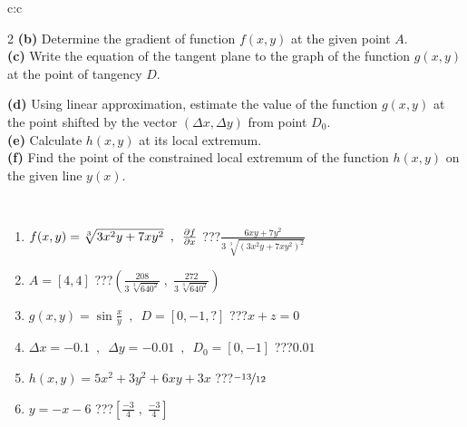 \documentclass[10pt]{report}
\begin{document}
\begin{tabular}{c:c}
\begin{minipage}[c][104.5mm][t]{0.5\linewidth}
\begin{center}
\begin{minipage}{0.95\linewidth}
\begin{center}
{\begin{multicols}{2}
\textbf{(b)} Determine the gradient of function \(f(x,y)\) at the given point \(A\). \\[1mm]
\textbf{(c)} Write the equation of the tangent plane to the graph of the function \(g(x,y)\) at the point of tangency \(D\). \par \columnbreak
\textbf{(d)} Using linear approximation, estimate the value of the function \(g(x,y)\) at the point shifted by the vector \((\Delta x, \Delta y)\) from point \(D_0\). \\[1mm]
\textbf{(e)} Calculate \(h(x,y)\) at its local extremum. \\[1mm]
\textbf{(f)} Find the point of the constrained local extremum of the function \(h(x,y)\) on the given line \(y(x)\). \\[1mm]
\end{multicols}
}
\end{center}
\end{minipage}
\\[4mm]
\begin{minipage}{0.79\linewidth}
\begin{center}
\begin{varwidth}{\linewidth}
\begin{enumerate}
\normalsizerr
\item $f(x,y) = \sqrt[3]{3x^2y + 7xy^2}\enspace , \enspace \pdv{f}{x}$\quad \dotfill\; ???\;\dotfill \quad $\frac{6xy+7y^2}{3\,\sqrt[3]{(3x^2y+7xy^2)^{2}}}$
\item $A = [4, 4]$\quad \dotfill\; ???\;\dotfill \quad $\left( \frac{208}{3\,\sqrt[3]{640^2}} \;,\; \frac{272}{3\,\sqrt[3]{640^2}} \right)$
\item $g(x,y) = \sin\frac{x}{y} \enspace , \enspace D = [0, -1, ?]$\quad \dotfill\; ???\;\dotfill \quad $x+z=0$
\item $\Delta x = {-0.1} \enspace,\enspace \Delta y = {-0.01} \enspace,\enspace D_0 = [0,-1]$\quad \dotfill\; ???\;\dotfill \quad $0.01$
\item $h(x,y) = 5x^2+3y^2+6xy+3x$\quad \dotfill\; ???\;\dotfill \quad $\nicefrac{-13}{12}$
\item $y = -x-6$\quad \dotfill\; ???\;\dotfill \quad $\left[\frac{-3}{4}\;,\;\frac{-3}{4}\right]$
\end{enumerate}
\end{varwidth}
\end{center}
\end{minipage}
\begin{minipage}{0.20\linewidth}
\begin{center}

\end{center}
\end{minipage}
\end{center}
\end{minipage}
\end{tabular}
\end{document}
